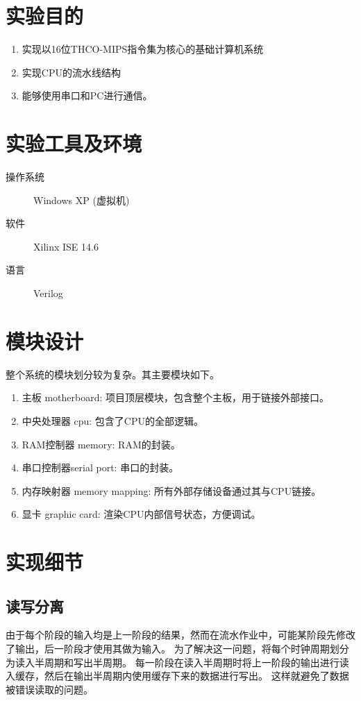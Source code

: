 
\section{实验目的}
\begin{enumerate}
  \item 实现以16位THCO-MIPS指令集为核心的基础计算机系统
  \item 实现CPU的流水线结构
  \item 能够使用串口和PC进行通信。
\end{enumerate}

\section{实验工具及环境}
\begin{description}
  \item[操作系统] Windows XP (虚拟机)
  \item[软件] Xilinx ISE 14.6
  \item[语言] Verilog
\end{description}

\section{模块设计}
整个系统的模块划分较为复杂。其主要模块如下。
\begin{enumerate}
  \item 主板 motherboard: 项目顶层模块，包含整个主板，用于链接外部接口。
  \item 中央处理器 cpu: 包含了CPU的全部逻辑。
  \item RAM控制器 memory: RAM的封装。
  \item 串口控制器serial port: 串口的封装。
  \item 内存映射器 memory mapping: 所有外部存储设备通过其与CPU链接。
  \item 显卡 graphic card: 渲染CPU内部信号状态，方便调试。
\end{enumerate}

\section{实现细节}
  \subsection{读写分离}
    由于每个阶段的输入均是上一阶段的结果，然而在流水作业中，可能某阶段先修改了输出，后一阶段才使用其做为输入。
    为了解决这一问题，将每个时钟周期划分为读入半周期和写出半周期。
    每一阶段在读入半周期时将上一阶段的输出进行读入缓存，然后在输出半周期内使用缓存下来的数据进行写出。
    这样就避免了数据被错误读取的问题。
